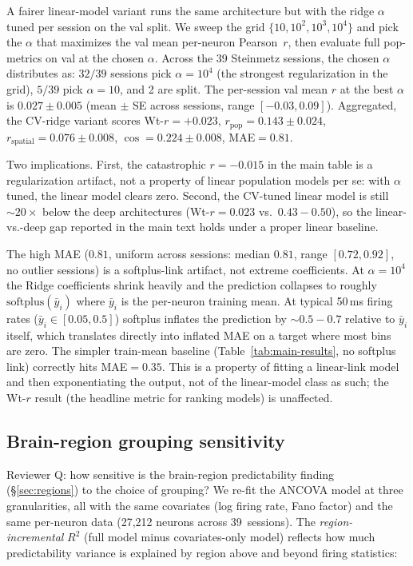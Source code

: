 \documentclass{article}
\begin{document}
A fairer linear-model variant runs the same architecture but with the
ridge $\alpha$ tuned per session on the val split.  We sweep the grid
$\{10, 10^{2}, 10^{3}, 10^{4}\}$ and pick the $\alpha$ that maximizes
the val mean per-neuron Pearson~$r$, then evaluate full pop-metrics on
val at the chosen $\alpha$.  Across the 39 Steinmetz sessions, the
chosen $\alpha$ distributes as: $32/39$ sessions pick $\alpha{=}10^{4}$
(the strongest regularization in the grid), $5/39$ pick $\alpha{=}10$,
and 2 are split.  The per-session val mean $r$ at the best
$\alpha$ is $0.027 \pm 0.005$ (mean $\pm$ SE across sessions, range
$[{-}0.03, 0.09]$).  Aggregated, the CV-ridge variant scores
Wt-$r{=}{+}0.023$, $r_\mathrm{pop}{=}0.143 \pm 0.024$,
$r_\mathrm{spatial}{=}0.076 \pm 0.008$, $\cos{=}0.224 \pm 0.008$,
MAE${=}0.81$.

Two implications.  First, the catastrophic $r{=}{-}0.015$ in the main
table is a regularization artifact, not a property of linear
population models per se: with $\alpha$ tuned, the linear model clears
zero.  Second, the CV-tuned linear model is still ${\sim}20\times$
below the deep architectures (Wt-$r{=}0.023$ vs.\ $0.43{-}0.50$), so
the linear-vs.-deep gap reported in the main text holds under a
proper linear baseline.

The high MAE ($0.81$, uniform across sessions: median $0.81$, range
$[0.72, 0.92]$, no outlier sessions) is a softplus-link artifact, not
extreme coefficients.  At $\alpha{=}10^{4}$ the Ridge coefficients
shrink heavily and the prediction collapses to roughly
$\mathrm{softplus}(\bar y_{i})$ where $\bar y_{i}$ is the per-neuron
training mean.  At typical 50\,ms firing rates ($\bar y_i \in
[0.05, 0.5]$) softplus inflates the prediction by ${\sim}0.5{-}0.7$
relative to $\bar y_i$ itself, which translates directly into
inflated MAE on a target where most bins are zero.  The simpler
train-mean baseline (Table~\ref{tab:main-results}, no softplus link)
correctly hits MAE${=}0.35$.  This is a property of fitting a
linear-link model and then exponentiating the output, not of the
linear-model class as such; the Wt-$r$ result (the headline metric
for ranking models) is unaffected.

\subsection{Brain-region grouping sensitivity}
\label{app:region-sensitivity}

Reviewer Q: how sensitive is the brain-region predictability finding
(\S\ref{sec:regions}) to the choice of grouping?  We re-fit the
ANCOVA model at three granularities, all with the same covariates
(log firing rate, Fano factor) and the same per-neuron data
(27{,}212 neurons across 39~sessions).  The \emph{region-incremental}
$R^{2}$ (full model minus covariates-only model) reflects how much
predictability variance is explained by region above and beyond
firing statistics:
\end{document}
